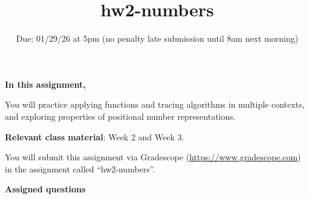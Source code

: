 

\title{hw2-numbers}
\date{Due: 01/29/26 at 5pm (no penalty late submission until 8am next morning)}

\maketitle
\thispagestyle{fancy}


{\bf In this assignment,}

You will practice applying functions and tracing algorithms in multiple contexts, 
and exploring properties of positional number representations.

{\bf Relevant class material}: Week 2 and Week 3.

You will submit this assignment via Gradescope
(\href{https://www.gradescope.com}{https://www.gradescope.com}) 
in the assignment called ``hw2-numbers''.

\instructions

{\bf Assigned questions}

